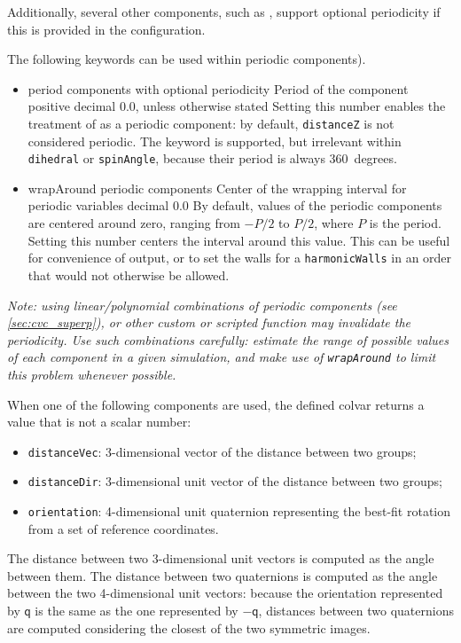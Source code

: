 Additionally, several other components, such as , support
optional periodicity if this is provided in the configuration.

The following keywords can be used within periodic components).

\begin{itemize}
\item %
  \keydef
    {period}{%
    components with optional periodicity}{%
    Period of the component}{%
    positive decimal}{%
    0.0, unless otherwise stated}{%
    Setting this number enables the treatment of as
    a periodic component: by default, \texttt{distanceZ} is not
    considered periodic.  The keyword is supported, but irrelevant
    within \texttt{dihedral} or \texttt{spinAngle}, because their
    period is always 360~degrees.}

\item %
  \keydef
    {wrapAround}{%
    periodic components}{%
    Center of the wrapping interval for periodic variables}{%
    decimal}{%
    0.0}{%
    By default, values of the periodic components are centered around zero, ranging from $-P/2$ to $P/2$, where $P$ is the period.
    Setting this number centers the interval around this value.
    This can be useful for convenience of output, or to set the walls for a \texttt{harmonicWalls} in an order that would not otherwise be allowed.}
\end{itemize}

\emph{Note: using linear/polynomial combinations of periodic components (see \ref{sec:cvc_superp}), or other custom or scripted function may invalidate the periodicity.  Use such combinations carefully: estimate the range of possible values of each component in a given simulation, and make use of \texttt{wrapAround} to limit this problem whenever possible.}



When one of the following components are used, the defined colvar returns a value that is not a scalar number:
\begin{itemize}
\item \texttt{distanceVec}: 3-dimensional vector of the distance
  between two groups;
\item \texttt{distanceDir}: 3-dimensional unit vector of the distance
  between two groups;
\item \texttt{orientation}: 4-dimensional unit quaternion representing
  the best-fit rotation from a set of reference coordinates.
\end{itemize}
The distance between two 3-dimensional unit vectors is computed as the
angle between them.  The distance between two quaternions is computed
as the angle between the two 4-dimensional unit vectors: because the
orientation represented by $\mathsf{q}$ is the same as the one
represented by $-\mathsf{q}$, distances between two quaternions are
computed considering the closest of the two symmetric images.

